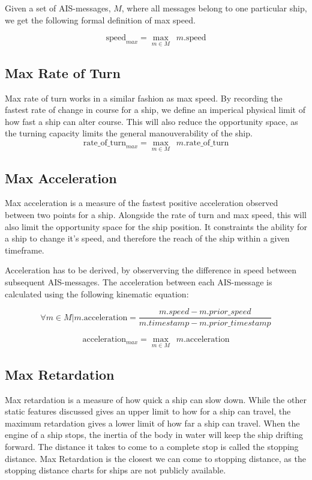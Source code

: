 Given a set of AIS-messages, $M$, where all messages belong to one particular ship, we get the following formal definition of max speed.

$$
\mathrm{speed}_{max} = \max_{m \in M}\;\:{m.\mathrm{speed}}
$$

\subsection{Max Rate of Turn}
Max rate of turn works in a similar fashion as max speed. By recording the fastest rate of change in course for a ship, we define an imperical physical limit of how fast a ship can alter course. This will also reduce the opportunity space, as the turning capacity limits the general manouverability of the ship. 
$$
\mathrm{rate\_of\_turn}_{max} = \max_{m \in M}\;\:{m.\mathrm{rate\_of\_turn}}
$$

\subsection{Max Acceleration}
Max acceleration is a measure of the fastest positive acceleration observed between two points for a ship. Alongside the rate of turn and max speed, this will also limit the opportunity space for the ship position. It constraints the ability for a ship to change it's speed, and therefore the reach of the ship within a given timeframe. 

Acceleration has to be derived, by observerving the difference in speed between subsequent AIS-messages. The acceleration between each AIS-message is calculated using the following kinematic equation:

$$
	\forall m \in M | m.\mathrm{acceleration} = \dfrac{m.speed - m.prior\_speed }{m.timestamp - m.prior\_timestamp}
$$

$$
\mathrm{acceleration}_{max} = \max_{m \in M}\;\:{m.\mathrm{acceleration}}
$$


\subsection{Max Retardation}
Max retardation is a measure of how quick a ship can slow down. While the other static features discussed gives an upper limit to how for a ship can travel, the maximum retardation gives a lower limit of how far a ship can travel. When the engine of a ship stops, the inertia of the body in water will keep the ship drifting forward. The distance it takes to come to a complete stop is called the stopping distance. Max Retardation is the closest we can come to stopping distance, as the stopping distance charts for ships are not publicly available.

